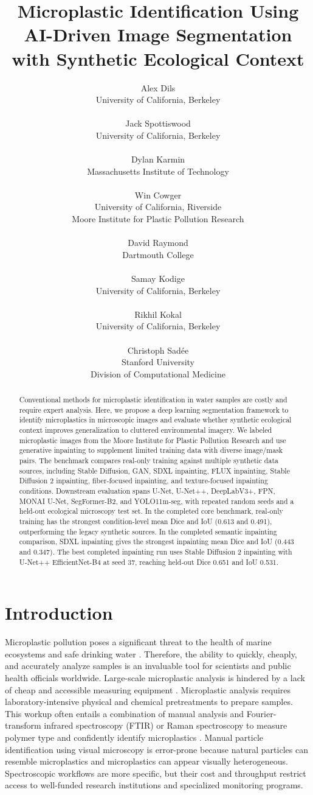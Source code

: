 \documentclass{article}
\title{Microplastic Identification Using AI-Driven Image Segmentation with Synthetic Ecological Context}
\author{
\begin{minipage}[t]{0.47\textwidth}
  \centering
  Alex Dils\\
  University of California, Berkeley\\
  \emailaddr{dils@berkeley.edu}\\[0.6em]
  Jack Spottiswood\\
  University of California, Berkeley\\
  \emailaddr{spottiswood@berkeley.edu}\\[0.6em]
  Dylan Karmin\\
  Massachusetts Institute of Technology\\
  \emailaddr{dkarmin@mit.edu}\\[0.6em]
  Win Cowger\\
  University of California, Riverside\\
  Moore Institute for Plastic Pollution Research\\
  \emailaddr{win@mooreplasticresearch.org}
\end{minipage}
\hfill
\begin{minipage}[t]{0.47\textwidth}
  \centering
  David Raymond\\
  Dartmouth College\\
  \emailaddr{david.w.raymond.29@dartmouth.edu}\\[0.6em]
  Samay Kodige\\
  University of California, Berkeley\\
  \emailaddr{samaykodige@berkeley.edu}\\[0.6em]
  Rikhil Kokal\\
  University of California, Berkeley\\
  \emailaddr{rikhilkokal@berkeley.edu}\\[0.6em]
  Christoph Sad\'ee\\
  Stanford University\\
  Division of Computational Medicine\\
  \emailaddr{sadee@stanford.edu}
\end{minipage}
}
\begin{document}
\maketitle

\begin{abstract}
  Conventional methods for microplastic identification in water samples are costly and require expert analysis. Here, we propose a deep learning segmentation framework to identify microplastics in microscopic images and evaluate whether synthetic ecological context improves generalization to cluttered environmental imagery. We labeled microplastic images from the Moore Institute for Plastic Pollution Research and use generative inpainting to supplement limited training data with diverse image/mask pairs. The benchmark compares real-only training against multiple synthetic data sources, including Stable Diffusion, GAN, SDXL inpainting, FLUX inpainting, Stable Diffusion 2 inpainting, fiber-focused inpainting, and texture-focused inpainting conditions. Downstream evaluation spans U-Net, U-Net++, DeepLabV3+, FPN, MONAI U-Net, SegFormer-B2, and YOLO11m-seg, with repeated random seeds and a held-out ecological microscopy test set. In the completed core benchmark, real-only training has the strongest condition-level mean Dice and IoU (0.613 and 0.491), outperforming the legacy synthetic sources. In the completed semantic inpainting comparison, SDXL inpainting gives the strongest inpainting mean Dice and IoU (0.443 and 0.347). The best completed inpainting run uses Stable Diffusion 2 inpainting with U-Net++ EfficientNet-B4 at seed 37, reaching held-out Dice 0.651 and IoU 0.531.
\end{abstract}

\section{Introduction}

Microplastic pollution poses a significant threat to the health of marine ecosystems and safe drinking water \cite{ziani2023}. Therefore, the ability to quickly, cheaply, and accurately analyze samples is an invaluable tool for scientists and public health officials worldwide. Large-scale microplastic analysis is hindered by a lack of cheap and accessible measuring equipment \cite{stock2020}. Microplastic analysis requires laboratory-intensive physical and chemical pretreatments to prepare samples. This workup often entails a combination of manual analysis and Fourier-transform infrared spectroscopy (FTIR) or Raman spectroscopy to measure polymer type and confidently identify microplastics \cite{primpke2020}. Manual particle identification using visual microscopy is error-prone because natural particles can resemble microplastics and microplastics can appear visually heterogeneous. Spectroscopic workflows are more specific, but their cost and throughput restrict access to well-funded research institutions and specialized monitoring programs.
\end{document}
